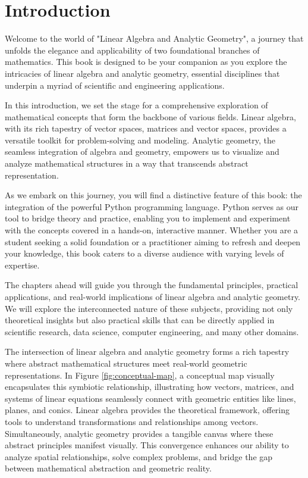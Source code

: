 \chapter{Introduction}

Welcome to the world of "Linear Algebra and Analytic Geometry", a journey that unfolds the elegance and applicability of two foundational branches of mathematics. This book is designed to be your companion as you explore the intricacies of linear algebra and analytic geometry, essential disciplines that underpin a myriad of scientific and engineering applications.

\noindent
In this introduction, we set the stage for a comprehensive exploration of mathematical concepts that form the backbone of various fields. Linear algebra, with its rich tapestry of vector spaces, matrices and vector spaces, provides a versatile toolkit for problem-solving and modeling. Analytic geometry, the seamless integration of algebra and geometry, empowers us to visualize and analyze mathematical structures in a way that transcends abstract representation.

\noindent
As we embark on this journey, you will find a distinctive feature of this book: the integration of the powerful Python programming language. Python serves as our tool to bridge theory and practice, enabling you to implement and experiment with the concepts covered in a hands-on, interactive manner. Whether you are a student seeking a solid foundation or a practitioner aiming to refresh and deepen your knowledge, this book caters to a diverse audience with varying levels of expertise.

\noindent
The chapters ahead will guide you through the fundamental principles, practical applications, and real-world implications of linear algebra and analytic geometry. We will explore the interconnected nature of these subjects, providing not only theoretical insights but also practical skills that can be directly applied in scientific research, data science, computer engineering, and many other domains.

\noindent
The intersection of linear algebra and analytic geometry forms a rich tapestry where abstract mathematical structures meet real-world geometric representations. In Figure \ref{fig:conceptual-map}, a conceptual map visually encapsulates this symbiotic relationship, illustrating how vectors, matrices, and systems of linear equations seamlessly connect with geometric entities like lines, planes, and conics. Linear algebra provides the theoretical framework, offering tools to understand transformations and relationships among vectors. Simultaneously, analytic geometry provides a tangible canvas where these abstract principles manifest visually. This convergence enhances our ability to analyze spatial relationships, solve complex problems, and bridge the gap between mathematical abstraction and geometric reality.

